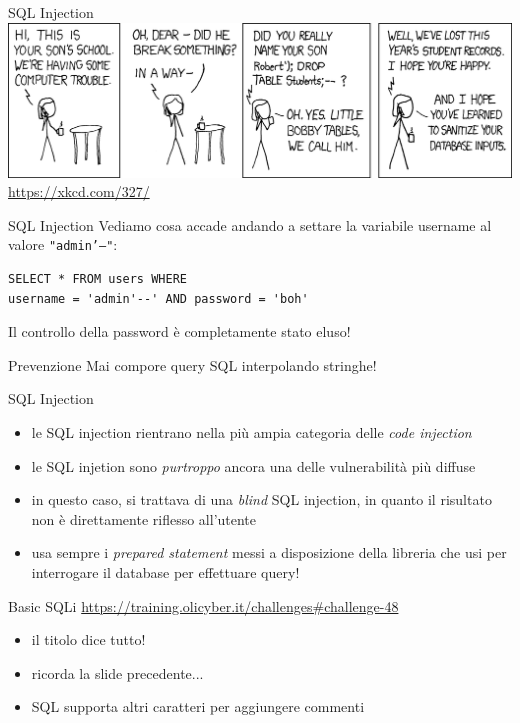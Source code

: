 \documentclass[12pt,handout]{beamer}
\begin{document}
\begin{frame}{SQL Injection}
    \includegraphics[width=\textwidth]{img/sqli.png}
    \url{https://xkcd.com/327/}
\end{frame}
    
\begin{frame}[fragile]{SQL Injection}
Vediamo cosa accade andando a settare la variabile username al valore \texttt{"admin'--"}:
\vfill
\begin{verbatim}
SELECT * FROM users WHERE 
username = 'admin'--' AND password = 'boh'
\end{verbatim}
\pause
\vfill
Il controllo della password è completamente stato eluso!
\vfill
\begin{alertblock}{Prevenzione}
Mai compore query SQL interpolando stringhe!
\end{alertblock}

\end{frame}

\begin{frame}{SQL Injection}
\begin{itemize}
\item le SQL injection rientrano nella più ampia categoria delle \textit{code injection}
\item le SQL injetion sono \textit{purtroppo} ancora una delle vulnerabilità più diffuse
\item in questo caso, si trattava di una \textit{blind} SQL injection, in quanto il risultato non è direttamente riflesso all'utente
\item usa sempre i \textit{prepared statement} messi a disposizione della libreria che usi per interrogare il database per effettuare query!
\end{itemize}
\end{frame}

\begin{frame}{Basic SQLi}
\url{https://training.olicyber.it/challenges\#challenge-48}
\vfill
\begin{itemize}
    \item il titolo dice tutto!
    \pause
    \item ricorda la slide precedente... 
    \pause
    \item SQL supporta altri caratteri per aggiungere commenti
\end{itemize}

\end{frame}
\end{document}
